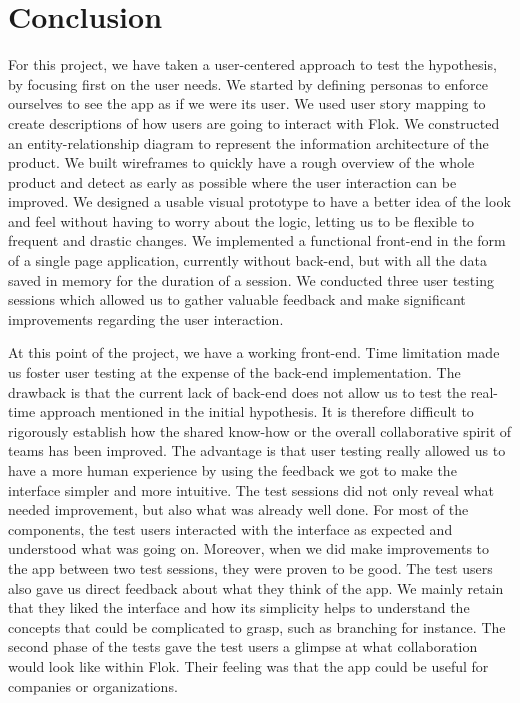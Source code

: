 \documentclass[a4paper,12pt,twoside]{article}
\begin{document}
\FloatBarrier
\section{Conclusion}

For this project, we have taken a user-centered approach to test the hypothesis, by focusing first on the user needs.
We started by defining personas to enforce ourselves to see the app as if we were its user.
We used user story mapping to create descriptions of how users are going to interact with Flok.
We constructed an entity-relationship diagram to represent the information architecture of the product.
We built wireframes to quickly have a rough overview of the whole product and detect as early as possible where the user interaction can be improved.
We designed a usable visual prototype to have a better idea of the look and feel without having to worry about the logic, letting us to be flexible to frequent and drastic changes.
We implemented a functional front-end in the form of a single page application, currently without back-end, but with all the data saved in memory for the duration of a session.
We conducted three user testing sessions which allowed us to gather valuable feedback and make significant improvements regarding the user interaction.

At this point of the project, we have a working front-end.
Time limitation made us foster user testing at the expense of the back-end implementation.
The drawback is that the current lack of back-end does not allow us to test the real-time approach mentioned in the initial hypothesis.
It is therefore difficult to rigorously establish how the shared know-how or the overall collaborative spirit of teams has been improved.
The advantage is that user testing really allowed us to have a more human experience by using the feedback we got to make the interface simpler and more intuitive.
The test sessions did not only reveal what needed improvement, but also what was already well done.
For most of the components, the test users interacted with the interface as expected and understood what was going on.
Moreover, when we did make improvements to the app between two test sessions, they were proven to be good.
The test users also gave us direct feedback about what they think of the app.
We mainly retain that they liked the interface and how its simplicity helps to understand the concepts that could be complicated to grasp, such as branching for instance.
The second phase of the tests gave the test users a glimpse at what collaboration would look like within Flok.
Their feeling was that the app could be useful for companies or organizations.
\end{document}
